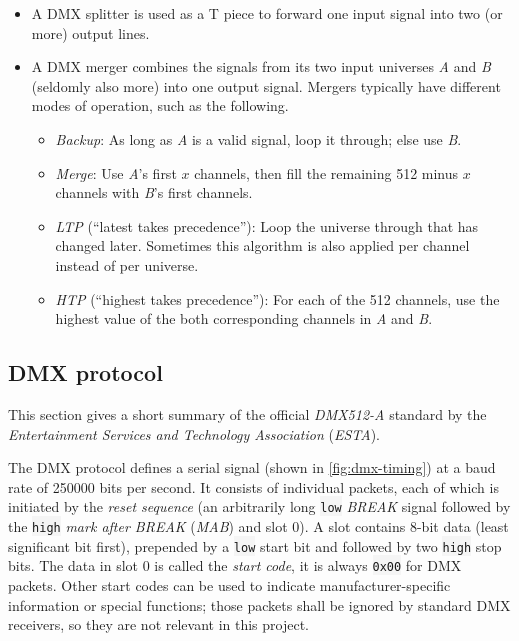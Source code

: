 \begin{itemize}
\tightlist
\item
  A DMX splitter is used as a T piece to forward one input signal into
  two (or more) output lines.
\item
  A DMX merger combines the signals from its two input universes
  \emph{A} and \emph{B} (seldomly also more) into one output signal.
  Mergers typically have different modes of operation, such as the
  following. \citep{showtec-dmx-merge}

  \begin{itemize}
  \tightlist
  \item
    \emph{Backup}: As long as \emph{A} is a valid signal, loop it
    through; else use \emph{B}.
  \item
    \emph{Merge}: Use \emph{A}'s first \(x\) channels, then fill the
    remaining 512 minus \(x\) channels with \emph{B}'s first channels.
  \item
    \emph{LTP} (``latest takes precedence''): Loop the universe through
    that has changed later. Sometimes this algorithm is also applied per
    channel instead of per universe.
  \item
    \emph{HTP} (``highest takes precedence''): For each of the 512
    channels, use the highest value of the both corresponding channels
    in \emph{A} and \emph{B}.
  \end{itemize}
\end{itemize}

\hypertarget{sec:dmx-protocol}{\subsection{DMX
protocol}\label{sec:dmx-protocol}}

This section gives a short summary of the official \emph{DMX512-A}
standard \citep{esta-dmx512-a} by the \emph{Entertainment Services and
Technology Association} (\emph{ESTA}).

The DMX protocol defines a serial signal (shown in
\cref{fig:dmx-timing}) at a baud rate of 250000 bits per second. It
consists of individual packets, each of which is initiated by the
\emph{reset sequence} (an arbitrarily long \colorbox{WhiteSmoke}{\lstinline!low!} \emph{BREAK}
signal followed by the \colorbox{WhiteSmoke}{\lstinline!high!} \emph{mark after BREAK}
(\emph{MAB}) and slot 0). A slot contains 8-bit data (least significant
bit first), prepended by a \colorbox{WhiteSmoke}{\lstinline!low!} start bit and followed by two
\colorbox{WhiteSmoke}{\lstinline!high!} stop bits. The data in slot 0 is called the \emph{start
code}, it is always \colorbox{WhiteSmoke}{\lstinline!0x00!} for DMX packets. Other start codes
can be used to indicate manufacturer-specific information or special
functions; those packets shall be ignored by standard DMX receivers, so
they are not relevant in this project.

